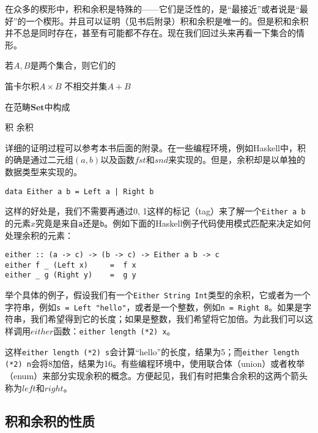 \documentclass{article}
\begin{document}
在众多的楔形中，积和余积是特殊的——它们是泛性的，是“最接近”或者说是“最好”的一个楔形。并且可以证明（见书后附录）积和余积是唯一的。但是积和余积并不总是同时存在，甚至有可能都不存在。现在我们回过头来再看一下集合的情形。

\begin{lemma}
若$A, B$是两个集合，则它们的

\begin{center}
笛卡尔积$A \times B$ \quad \quad \quad 不相交并集$A + B$
\end{center}

在范畴$\pmb{Set}$中构成

\begin{center}
积 \quad \quad \quad 余积
\end{center}
\end{lemma}

详细的证明过程可以参考本书后面的附录。在一些编程环境，例如Haskell中，积的确是通过二元组$(a, b)$以及函数$fst$和$snd$来实现的。但是，余积却是以单独的数据类型来实现的。

\lstset{frame = single}
\begin{lstlisting}
data Either a b = Left a | Right b
\end{lstlisting}

这样的好处是，我们不需要再通过0, 1这样的标记（tag）来了解一个\texttt{Either a b}的元素$x$究竟是来自\texttt{a}还是\texttt{b}。例如下面的Haskell例子代码使用模式匹配来决定如何处理余积的元素：

\begin{lstlisting}
either :: (a -> c) -> (b -> c) -> Either a b -> c
either f _ (Left x)     =  f x
either _ g (Right y)    =  g y
\end{lstlisting}
\lstset{frame = none}

举个具体的例子，假设我们有一个\texttt{Either String Int}类型的余积，它或者为一个字符串，例如\texttt{s = Left "hello"}，或者是一个整数，例如\texttt{n = Right 8}。如果是字符串，我们希望得到它的长度；如果是整数，我们希望将它加倍。为此我们可以这样调用$either$函数：\texttt{either length (*2) x}。

这样\texttt{either length (*2) s}会计算“hello”的长度，结果为5；而\texttt{either length (*2) n}会将8加倍，结果为16。有些编程环境中，使用联合体（union）或者枚举（enum）来部分实现余积的概念。方便起见，我们有时把集合余积的这两个箭头称为$left$和$right$。

\subsection{积和余积的性质}
\end{document}

